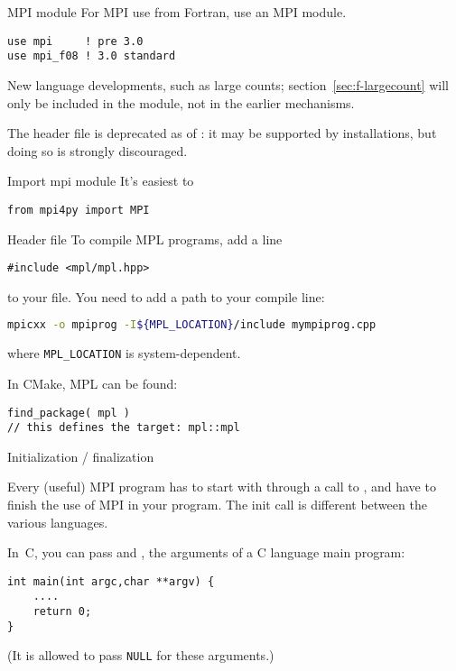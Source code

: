 \begin{fortrannote}{MPI module}
For MPI use from Fortran, use an MPI module.
\begin{verbatim}
use mpi     ! pre 3.0
use mpi_f08 ! 3.0 standard
\end{verbatim}

  New language developments, such as large counts; section~\ref{sec:f-largecount}
  will only be included in the  module,
  not in the earlier mechanisms.

  The header file  is deprecated as of :
  it may be supported by installations, but doing so is strongly discouraged.
\end{fortrannote}

\begin{pythonnote}{Import mpi module}
  It's easiest to
\begin{lstlisting}
from mpi4py import MPI
\end{lstlisting}
\end{pythonnote}

\begin{mplnote}{Header file}
  To compile MPL programs, add a line
\begin{lstlisting}
#include <mpl/mpl.hpp>
\end{lstlisting}
  to your file.
  You need to add a path to your compile line:
\begin{lstlisting}[language=bash]
mpicxx -o mpiprog -I${MPL_LOCATION}/include mympiprog.cpp
\end{lstlisting}
where \lstinline[language=bash]{MPL_LOCATION} is system-dependent.

In CMake, MPL can be found:
\begin{lstlisting}
find_package( mpl )
// this defines the target: mpl::mpl
\end{lstlisting}
\end{mplnote}

 {Initialization / finalization}
\label{sec:mpi-init}

Every (useful) MPI program has to start with 
through a call to
, and have
 to finish the use of MPI in your program.
The init call is different between the various languages.

In~C, you can pass  and , the arguments
of a C language main program:
 \begin{lstlisting}
int main(int argc,char **argv) {
    ....
    return 0;
}
\end{lstlisting}
(It is allowed to pass \lstinline{NULL} for these arguments.)

